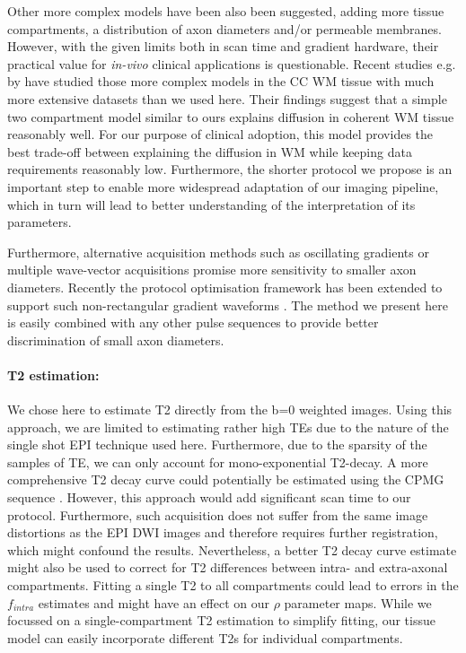 Other more complex models have been also been suggested, adding more tissue compartments, a distribution of axon diameters and/or permeable membranes. However, with the given limits both in scan time and gradient hardware, their practical value for \emph{in-vivo} clinical applications is questionable. Recent studies e.g. by \citet{Panagiotaki:2012, Ferizi:2012} have studied those more complex models in the \gls{CC} WM tissue with much more extensive datasets than we used here. Their findings suggest that a simple two compartment model similar to ours explains diffusion in coherent WM tissue reasonably well. For our purpose of clinical adoption, this model provides the best trade-off between explaining the diffusion in WM while keeping data requirements reasonably low. Furthermore, the shorter protocol we propose is an important step to enable more widespread adaptation of our imaging pipeline, which in turn will lead to better understanding of the interpretation of its parameters.


Furthermore, alternative acquisition methods such as oscillating gradients \citep{Does:2003, Colvin:2008} or multiple wave-vector acquisitions \citep{Komlosh:2008,Koch:2008,Avram:2012} promise more sensitivity to smaller axon diameters. Recently the protocol optimisation framework has been extended to support such non-rectangular gradient waveforms \citep{Drobnjak:2010,Siow:2012a}. The method we present here is easily combined with any other pulse sequences to provide better discrimination of small axon diameters.

\paragraph{T2 estimation: } We chose here to estimate T2 directly from the b=0 weighted images. Using this approach, we are limited to estimating rather high \glspl{TE} due to the nature of the single shot EPI technique used here. Furthermore, due to the sparsity of the samples of \gls{TE}, we can only account for mono-exponential T2-decay. A more comprehensive T2 decay curve could potentially be estimated using the \gls{CPMG} sequence \citep{Pell:2006}. However, this approach would add significant scan time to our protocol. Furthermore, such acquisition does not suffer from the same image distortions as the EPI DWI images and therefore requires further registration, which might confound the results. Nevertheless, a better T2 decay curve estimate might also be used to correct for T2 differences between intra- and extra-axonal compartments. Fitting a single T2 to all compartments could lead to errors in  the $f_{intra}$ estimates and might have an effect on our $\rho$ parameter maps. While we focussed on a single-compartment T2 estimation to simplify fitting, our tissue model can easily incorporate different T2s for individual compartments. 

